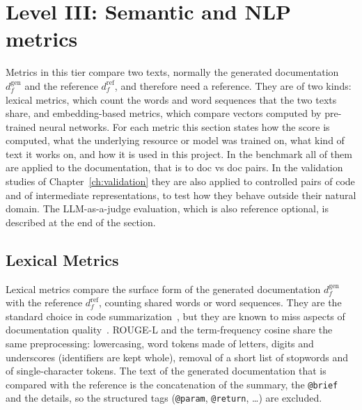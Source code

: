 \section{Level III: Semantic and NLP metrics}
\label{sec:metrics-level3}
Metrics in this tier compare two texts, normally the generated documentation $d_f^{\mathrm{gen}}$
and the reference $d_f^{\mathrm{ref}}$, and therefore need a reference. They are of two kinds: lexical
metrics, which count the words and word sequences that the two texts share, and embedding-based
metrics, which compare vectors computed by pre-trained neural networks. For each metric this section
states how the score is computed, what the underlying resource or model was trained on, what kind of
text it works on, and how it is used in this project. In the benchmark all of them are applied to the
documentation, that is to doc vs doc pairs. In the validation studies of Chapter~\ref{ch:validation}
they are also applied to controlled pairs of code and of intermediate representations, to test how
they behave outside their natural domain. The LLM-as-a-judge evaluation, which is also reference
optional, is described at the end of the section.

\subsection{Lexical Metrics}
\label{sec:m-lexical}
Lexical metrics compare the surface form of the generated documentation $d_f^{\mathrm{gen}}$ with
the reference $d_f^{\mathrm{ref}}$, counting shared words or word sequences. They are the standard
choice in code summarization~\cite{zhang_survey_2022, zhu_deep_2024, wu_can_2024}, but they are
known to miss aspects of documentation quality~\cite{hoang_codewiki_2026}. ROUGE-L and the
term-frequency cosine share the same preprocessing: lowercasing, word tokens made of letters, digits and
underscores (identifiers are kept whole), removal of a short list of stopwords and of
single-character tokens. The text of the generated documentation that is compared with the
reference is the concatenation of the summary, the \texttt{@brief} and the details, so the
structured tags (\texttt{@param}, \texttt{@return}, \ldots) are excluded.

